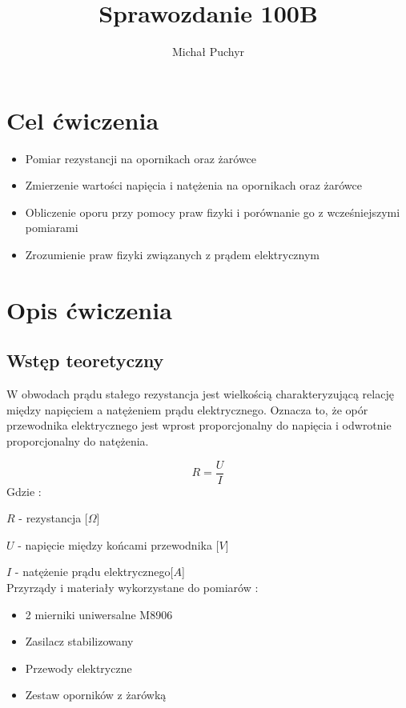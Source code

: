 \documentclass[12pt]{article}
\author{Michał Puchyr}
\title{Sprawozdanie 100B}
\begin{document}
\maketitle

\section{Cel ćwiczenia}

\begin{itemize}
    \item Pomiar rezystancji na opornikach oraz żarówce
    \item Zmierzenie wartości napięcia i natężenia na opornikach oraz żarówce
    \item Obliczenie oporu przy pomocy praw fizyki i porównanie go z wcześniejszymi pomiarami
    \item Zrozumienie praw fizyki związanych z prądem elektrycznym
\end{itemize}

\section{Opis ćwiczenia}
\subsection{Wstęp teoretyczny}

W obwodach prądu stałego rezystancja jest wielkością charakteryzującą relację między napięciem
a natężeniem prądu elektrycznego. Oznacza to, że opór przewodnika elektrycznego jest 
wprost proporcjonalny do napięcia i odwrotnie proporcjonalny do natężenia.

\label{ohm}
$$ R = \frac{U}{I} $$ 
Gdzie :

$R$ - rezystancja [$\Omega$]

$U$ - napięcie między końcami przewodnika [$V$]

$I$ - natężenie prądu elektrycznego[$A$]\\

Przyrządy i materiały wykorzystane do pomiarów : 
\begin{itemize}
    \item 2 mierniki uniwersalne M8906
    \item Zasilacz stabilizowany
    \item Przewody elektryczne
    \item Zestaw oporników z żarówką
\end{itemize}
\end{document}
